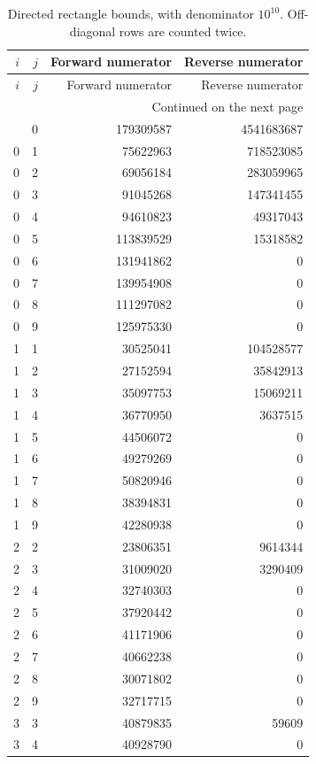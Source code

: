 \documentclass[11pt]{article}
\theoremstyle{remark}
\begin{document}
\clearpage
\begingroup\small
\begin{longtable}{@{}rrrr@{}}
\caption{Directed rectangle bounds, with denominator $10^{10}$.
Off-diagonal rows are counted twice.}
\label{tab:rational-cells}\\
\toprule $i$ & $j$ & Forward numerator & Reverse numerator \\\midrule
\endfirsthead
\toprule $i$ & $j$ & Forward numerator & Reverse numerator \\\midrule
\endhead
\midrule
\multicolumn{4}{r}{\small Continued on the next page}\\
\endfoot
\bottomrule
\endlastfoot
0 & 0 & 179309587 & 4541683687 \\
0 & 1 & 75622963 & 718523085 \\
0 & 2 & 69056184 & 283059965 \\
0 & 3 & 91045268 & 147341455 \\
0 & 4 & 94610823 & 49317043 \\
0 & 5 & 113839529 & 15318582 \\
0 & 6 & 131941862 & 0 \\
0 & 7 & 139954908 & 0 \\
0 & 8 & 111297082 & 0 \\
0 & 9 & 125975330 & 0 \\
1 & 1 & 30525041 & 104528577 \\
1 & 2 & 27152594 & 35842913 \\
1 & 3 & 35097753 & 15069211 \\
1 & 4 & 36770950 & 3637515 \\
1 & 5 & 44506072 & 0 \\
1 & 6 & 49279269 & 0 \\
1 & 7 & 50820946 & 0 \\
1 & 8 & 38394831 & 0 \\
1 & 9 & 42280938 & 0 \\
2 & 2 & 23806351 & 9614344 \\
2 & 3 & 31009020 & 3290409 \\
2 & 4 & 32740303 & 0 \\
2 & 5 & 37920442 & 0 \\
2 & 6 & 41171906 & 0 \\
2 & 7 & 40662238 & 0 \\
2 & 8 & 30071802 & 0 \\
2 & 9 & 32717715 & 0 \\
3 & 3 & 40879835 & 59609 \\
3 & 4 & 40928790 & 0 \\

\end{longtable}
\end{document}

